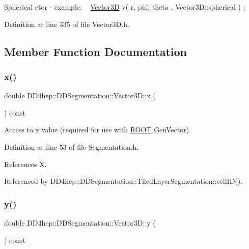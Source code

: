 Spherical c\textquotesingle{}tor -\/ example\+: ~\newline
 \hyperlink{struct_d_d4hep_1_1_d_d_segmentation_1_1_vector3_d}{Vector3D} v( r, phi, theta , Vector3\+D\+::spherical ) ; 

Definition at line 335 of file Vector3\+D.\+h.



\subsection{Member Function Documentation}
\hypertarget{struct_d_d4hep_1_1_d_d_segmentation_1_1_vector3_d_adadba77bba380b6ab14b051a2d6456eb}{}\label{struct_d_d4hep_1_1_d_d_segmentation_1_1_vector3_d_adadba77bba380b6ab14b051a2d6456eb} 
\subsubsection{\texorpdfstring{x()}{x()}}
{\footnotesize\ttfamily double D\+D4hep\+::\+D\+D\+Segmentation\+::\+Vector3\+D\+::x (\begin{DoxyParamCaption}{ }\end{DoxyParamCaption}) const\hspace{0.3cm}{\ttfamily [inline]}}



Access to x value (required for use with \hyperlink{namespace_r_o_o_t}{R\+O\+OT} Gen\+Vector) 



Definition at line 53 of file Segmentation.\+h.



References X.



Referenced by D\+D4hep\+::\+D\+D\+Segmentation\+::\+Tiled\+Layer\+Segmentation\+::cell\+I\+D().

\hypertarget{struct_d_d4hep_1_1_d_d_segmentation_1_1_vector3_d_ad453bb8f29162b62eba0e627d124814d}{}\label{struct_d_d4hep_1_1_d_d_segmentation_1_1_vector3_d_ad453bb8f29162b62eba0e627d124814d} 
\subsubsection{\texorpdfstring{y()}{y()}}
{\footnotesize\ttfamily double D\+D4hep\+::\+D\+D\+Segmentation\+::\+Vector3\+D\+::y (\begin{DoxyParamCaption}{ }\end{DoxyParamCaption}) const\hspace{0.3cm}{\ttfamily [inline]}}




